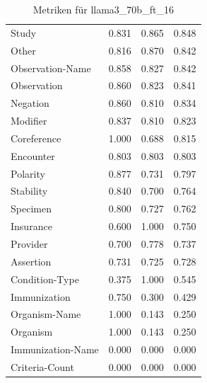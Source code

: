 \begin{table}[htbp]
\begin{tabular}{p{5cm}ccc}
Study & 0.831 & 0.865 & 0.848 \\
Other & 0.816 & 0.870 & 0.842 \\
Observation-Name & 0.858 & 0.827 & 0.842 \\
Observation & 0.860 & 0.823 & 0.841 \\
Negation & 0.860 & 0.810 & 0.834 \\
Modifier & 0.837 & 0.810 & 0.823 \\
Coreference & 1.000 & 0.688 & 0.815 \\
Encounter & 0.803 & 0.803 & 0.803 \\
Polarity & 0.877 & 0.731 & 0.797 \\
Stability & 0.840 & 0.700 & 0.764 \\
Specimen & 0.800 & 0.727 & 0.762 \\
Insurance & 0.600 & 1.000 & 0.750 \\
Provider & 0.700 & 0.778 & 0.737 \\
Assertion & 0.731 & 0.725 & 0.728 \\
Condition-Type & 0.375 & 1.000 & 0.545 \\
Immunization & 0.750 & 0.300 & 0.429 \\
Organism-Name & 1.000 & 0.143 & 0.250 \\
Organism & 1.000 & 0.143 & 0.250 \\
Immunization-Name & 0.000 & 0.000 & 0.000 \\
Criteria-Count & 0.000 & 0.000 & 0.000 \\
\bottomrule
\end{tabular}
\caption{Metriken für llama3_70b_ft_16}
\label{tab:metrics_llama3_70b_ft_16}
\end{table}